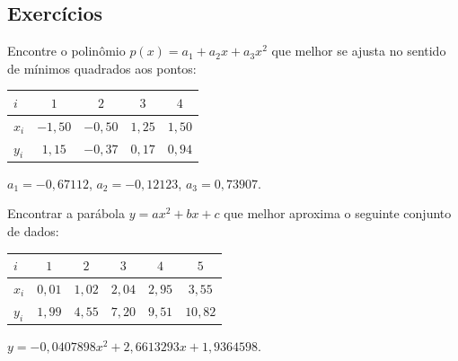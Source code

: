%
%

\subsection*{Exercícios}

\begin{exer}
  Encontre o polinômio $p(x) = a_1 + a_2x + a_3x^2$ que melhor se ajusta no sentido de mínimos quadrados aos pontos:
  \begin{center}
    \begin{tabular}{l|cccc}
      $i$ & $1$ & $2$ & $3$ & $4$ \\\hline
      $x_i$ & $-1,50$ & $-0,50$ & $1,25$ & $1,50$\\
      $y_i$ & $1,15$ & $-0,37$ & $0,17$ & $0,94$
  \end{tabular}
    \end{center}
\end{exer}
\begin{resp}
    $a_1 = -0,67112$, $a_2 = -0,12123$, $a_3 = 0,73907$.
\end{resp}

\begin{exer}Encontrar a parábola $y=ax^2+bx+c$ que melhor aproxima o seguinte conjunto de dados:
  \begin{center}
    \begin{tabular}{l|ccccc}
      $i$ & $1$ & $2$ & $3$ & $4$ & $5$ \\\hline
      $x_i$ & $0,01$ & $1,02$ & $2,04$ & $2,95$ & $3,55$\\
      $y_i$ & $1,99$ & $4,55$ & $7,20$ & $9,51$ & $10,82$
    \end{tabular}
  \end{center}
\end{exer}
\begin{resp}
    $y=-0,0407898x^2+ 2,6613293x+ 1,9364598$.
\end{resp}

